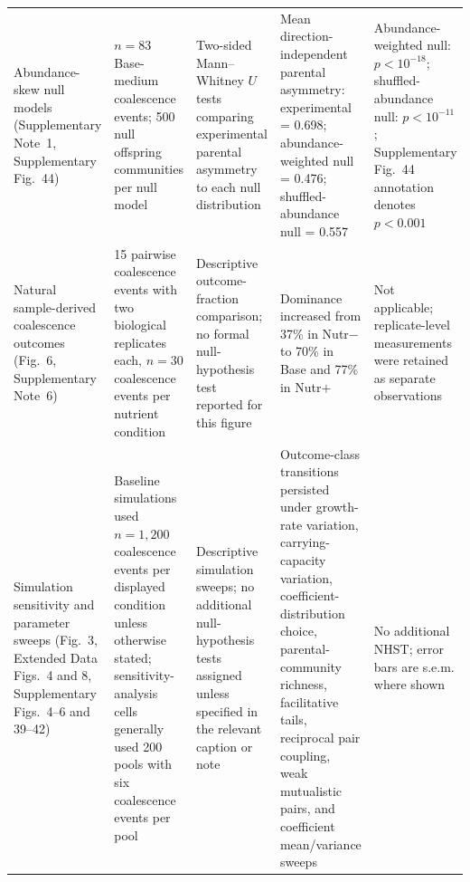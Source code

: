 \begin{longtable}{L{0.16\textwidth}L{0.18\textwidth}L{0.18\textwidth}L{0.22\textwidth}L{0.18\textwidth}}
Abundance-skew null models (Supplementary Note~1, Supplementary Fig.~44) &
$n = 83$ Base-medium coalescence events; 500 null offspring communities per null model &
Two-sided Mann--Whitney $U$ tests comparing experimental parental asymmetry to each null distribution &
Mean direction-independent parental asymmetry: experimental = 0.698; abundance-weighted null = 0.476; shuffled-abundance null = 0.557 &
Abundance-weighted null: $p < 10^{-18}$; shuffled-abundance null: $p < 10^{-11}$; Supplementary Fig.~44 annotation denotes $p < 0.001$ \\

Natural sample-derived coalescence outcomes (Fig.~6, Supplementary Note~6) &
15 pairwise coalescence events with two biological replicates each, $n = 30$ coalescence events per nutrient condition &
Descriptive outcome-fraction comparison; no formal null-hypothesis test reported for this figure &
Dominance increased from 37\% in Nutr$-$ to 70\% in Base and 77\% in Nutr$+$ &
Not applicable; replicate-level measurements were retained as separate observations \\

Simulation sensitivity and parameter sweeps (Fig.~3, Extended Data Figs.~4 and 8, Supplementary Figs.~4--6 and 39--42) &
Baseline simulations used $n = 1{,}200$ coalescence events per displayed condition unless otherwise stated; sensitivity-analysis cells generally used 200 pools with six coalescence events per pool &
Descriptive simulation sweeps; no additional null-hypothesis tests assigned unless specified in the relevant caption or note &
Outcome-class transitions persisted under growth-rate variation, carrying-capacity variation, coefficient-distribution choice, parental-community richness, facilitative tails, reciprocal pair coupling, weak mutualistic pairs, and coefficient mean/variance sweeps &
No additional NHST; error bars are s.e.m. where shown \\

\end{longtable}
\endgroup
